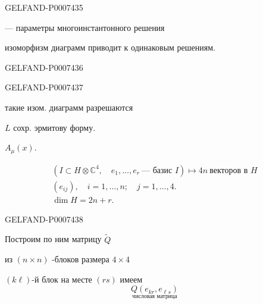 \begin{GelfandAdjacentEvidence}{GELFAND-P000743}{5}

--- параметры многоинстантонного решения

изоморфизм диаграмм приводит к одинаковым решениям.

\end{GelfandAdjacentEvidence}
\begin{GelfandAdjacentEvidence}{GELFAND-P000743}{6}

\end{GelfandAdjacentEvidence}
\begin{GelfandAdjacentEvidence}{GELFAND-P000743}{7}


такие изом. диаграмм разрешаются

\(L\) сохр. эрмитову форму.

 \(A_\mu(x)\).

\begin{gather*}
(I\subset H\otimes\mathbb C^4,\quad e_1,\ldots,e_r\ \text{--- базис } I)
\longmapsto 4n\ \text{векторов в }H\\
(e_{ij}),\quad i=1,\ldots,n;\quad j=1,\ldots,4.\\
\dim H=2n+r.
\end{gather*}
\end{GelfandAdjacentEvidence}
\begin{GelfandAdjacentEvidence}{GELFAND-P000743}{8}


Построим по ним матрицу \(\widetilde Q\)

из \((n\times n)\) -блоков размера \(4\times4\)

\((k\ell)\)-й блок на месте \((rs)\) имеем
\[
\underset{\text{числовая матрица}}{Q(e_{kr},e_{\ell s})}
\]
\end{GelfandAdjacentEvidence}


